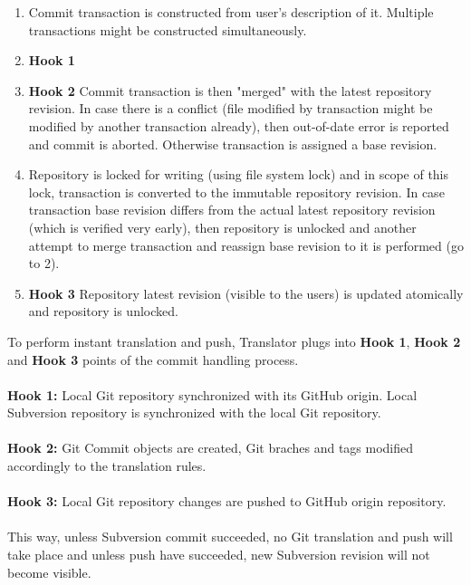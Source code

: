 \begin{enumerate}
\compactlist
\item Commit transaction is constructed from user's description of it. Multiple transactions might be constructed simultaneously.
\item \textbf{Hook 1} %
\item \textbf{Hook 2} Commit transaction is then "merged" with the latest repository revision. In case there is a conflict (file modified by transaction might be modified by another transaction already), then out-of-date error is reported and commit is aborted. Otherwise transaction is assigned a base revision.
\item Repository is locked for writing (using file system lock) and in scope of this lock, transaction is converted to the immutable repository revision. In case transaction base revision differs from the actual latest repository revision (which is verified very early), then repository is unlocked and another attempt to merge transaction and reassign base revision to it is performed (go to 2).
\item \textbf{Hook 3} Repository latest revision (visible to the users) is updated atomically and repository is unlocked.
\end{enumerate}
To perform instant translation and push, Translator plugs into \textbf{Hook 1}, \textbf{Hook 2} and \textbf{Hook 3} points of the commit handling process.
\\\\
\textbf{Hook 1:} Local Git repository synchronized with its GitHub origin. Local Subversion repository is synchronized with the local Git repository.
\\\\
\textbf{Hook 2:} Git Commit objects are created, Git braches and tags modified accordingly to the translation rules.
\\\\
\textbf{Hook 3:} Local Git repository changes are pushed to GitHub origin repository.
\\\\
This way, unless Subversion commit succeeded, no Git translation and push will take place and unless push have succeeded, new Subversion revision will not become visible.
